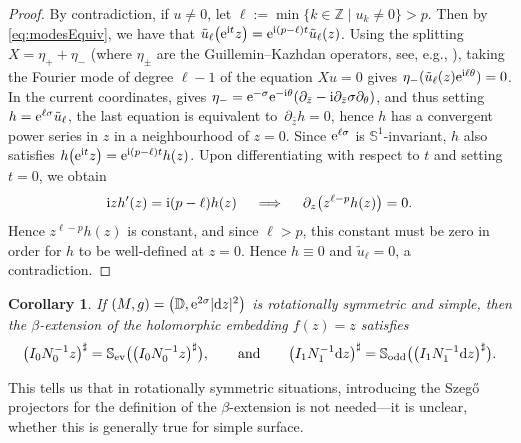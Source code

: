 \documentclass[pdftex]{sigma}
\numberwithin{equation}{section}
\newtheorem{Corollary}[Theorem]{Corollary}
\theoremstyle{definition}
\newcommand{\1}{{\bf 1}}
\newcommand \Dm { \mathbb{D}}
\newcommand \Sm { \mathbb{S}}
\newcommand \Zm { \mathbb{Z}}
\newcommand \zbar { \bar{z}}
\newcommand \tu {\tilde{u}}
\begin{document}
\begin{proof}By contradiction, if $u\ne 0$, let $\ell := \min\{k\in \Zm \mid u_k\ne 0\}>p$. Then by \eqref{eq:modesEquiv}, we have that $\tu_\ell \bigl({\rm e}^{{\rm i}t}z\bigr) = {\rm e}^{{\rm i}(p-\ell)t} \tu_\ell(z)$. {Using the splitting $X = \eta_+ + \eta_-$ (where $\eta_\pm$ are the Guillemin--Kazhdan operators, see, e.g., \cite[Definition~6.1.4]{PSU23}), taking the Fourier mode of degree $\ell-1$ of the equation $Xu =0$ gives $\eta_- (\tu_\ell (z) {\rm e}^{{\rm i}\ell \theta}) = 0$. In the current coordinates, \cite[Lemma~6.1.8]{PSU23} gives $\eta_- = {\rm e}^{-\sigma} {\rm e}^{-{\rm i}\theta} (\partial_{\bar{z}} - {\rm i}\partial_{\bar{z}}\sigma \partial_\theta)$, and thus setting $h = {\rm e}^{\ell\sigma} \tu_\ell$, the last equation is equivalent to~${\partial_{\zbar} h = 0}$}, hence $h$ has a convergent power series in $z$ in a neighbourhood of $z=0$. Since ${\rm e}^{\ell\sigma}$ is $\Sm^1$-invariant, $h$ also satisfies $h\bigl({\rm e}^{{\rm i}t}z\bigr) = {\rm e}^{{\rm i}(p-\ell)t} h(z)$. Upon differentiating with respect to $t$ and setting $t=0$, we obtain
	\begin{align*}
		{\rm i}z h'(z) ={\rm i} (p-\ell) h(z) \quad \implies \quad \partial_z \bigl(z^{\ell-p} h(z)\bigr) = 0.
	\end{align*}
	Hence $z^{\ell-p} h(z)$ is constant, and since $\ell>p$, this constant must be zero in order for $h$ to be well-defined at $z=0$. Hence $h\equiv 0$ and $\tu_\ell=0$, a contradiction.
\end{proof}

\begin{Corollary}\label{cor:noSzego} If $(M,g) = \bigl(\Dm,{\rm e}^{2\sigma}|{\rm d}z|^2\bigr)$ is rotationally symmetric and simple, then the $\beta$\nobreakdash-ex\-ten\-sion of the holomorphic embedding $f(z)=z$ satisfies
	\begin{align*}
		\bigl(I_0 N_0^{-1} z\bigr)^\sharp = \Sm_{\mathrm{ev}} \bigl(\bigl(I_0 N_0^{-1} z\bigr)^\sharp \bigr), \qquad \text{and}\qquad \bigl(I_1 N_1^{-1} {\rm d}z\bigr)^\sharp = \Sm_{\mathrm{odd}} \bigl(\bigl(I_1 N_1^{-1} {\rm d}z\bigr)^\sharp \bigr).
	\end{align*}
\end{Corollary}

This tells us that in rotationally symmetric situations, introducing the Szeg\H{o} projectors for the definition of the $\beta$-extension is not needed---it is unclear, whether this is generally true for simple surface.
\end{document}
